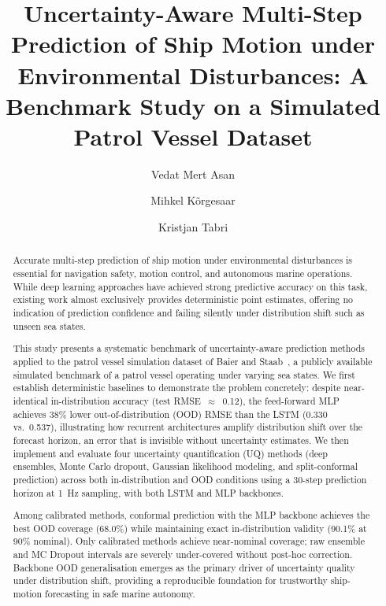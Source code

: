 \documentclass[a4paper,fleqn]{cas-sc}
\begin{document}
\title{Uncertainty-Aware Multi-Step Prediction of Ship Motion under 
Environmental Disturbances: A Benchmark Study on a Simulated Patrol Vessel Dataset}

\author[1]{Vedat Mert Asan}

\cormark[1]

\author[1]{Mihkel Kõrgesaar}
\author[1]{Kristjan Tabri}




\begin{abstract}
Accurate multi-step prediction of ship motion under environmental disturbances is essential for navigation safety, motion control, and autonomous marine operations. While deep learning approaches have achieved strong predictive accuracy on this task, existing work almost exclusively provides deterministic point estimates, offering no indication of prediction confidence and failing silently under distribution shift such as unseen sea states.

This study presents a systematic benchmark of uncertainty-aware prediction methods applied to the patrol vessel simulation dataset of Baier and Staab~\cite{baier2022darus}, a publicly available simulated benchmark of a patrol vessel operating under varying sea states. We first establish deterministic baselines to demonstrate the problem concretely: despite near-identical in-distribution accuracy (test RMSE~$\approx$~0.12), the feed-forward MLP achieves 38\% lower out-of-distribution (OOD) RMSE than the LSTM (0.330 vs.\ 0.537), illustrating how recurrent architectures amplify distribution shift over the forecast horizon, an error that is invisible without uncertainty estimates. We then implement and evaluate four uncertainty quantification (UQ) methods (deep ensembles, Monte Carlo dropout, Gaussian likelihood modeling, and split-conformal prediction) across both in-distribution and OOD conditions using a 30-step prediction horizon at 1~Hz sampling, with both LSTM and MLP backbones.

Among calibrated methods, conformal prediction with the MLP backbone achieves the best OOD coverage (68.0\%) while maintaining exact in-distribution validity (90.1\% at 90\% nominal). Only calibrated methods achieve near-nominal coverage; raw ensemble and MC Dropout intervals are severely under-covered without post-hoc correction. Backbone OOD generalisation emerges as the primary driver of uncertainty quality under distribution shift, providing a reproducible foundation for trustworthy ship-motion forecasting in safe marine autonomy.
\end{abstract}
\end{document}
